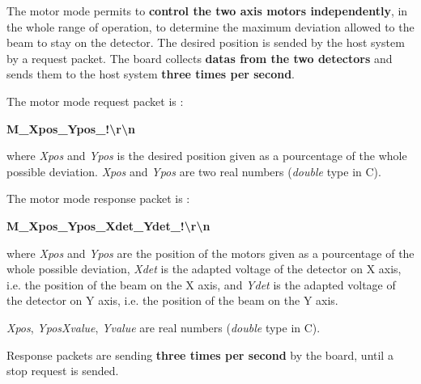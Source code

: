\documentclass[14pt,fleqn]{book} %
\begin{document}
The motor mode permits to \textbf{control the two axis motors independently}, in the whole range of operation, to determine the maximum deviation allowed to the beam to stay on the detector. The desired position is sended by the host system by a request packet. The board collects \textbf{datas from the two detectors} and sends them to the host system \textbf{three times per second}.

\medskip

The motor mode request packet is : 

\begin{center}
\textbf{\color{blue}\large M\_Xpos\_Ypos\_!\textbackslash{}r\textbackslash{}n}
\end{center}

\medskip

where \textit{\color{blue}Xpos} and \textit{\color{blue}Ypos} is the desired position given as a pourcentage of the whole possible deviation. \textit{\color{blue}Xpos} and \textit{\color{blue}Ypos} are two real numbers (\textit{double} type in C).

\medskip


The motor mode response packet is : 

\begin{center}
\textbf{\color{orange}\large M\_Xpos\_Ypos\_Xdet\_Ydet\_!\textbackslash{}r\textbackslash{}n}
\end{center}


\medskip

where \textit{\color{orange}Xpos} and \textit{\color{orange}Ypos} are the position of the motors given as a pourcentage of the whole possible deviation, \textit{\color{orange}Xdet} is the adapted voltage of the detector on X axis, i.e. the position of the beam on the X axis, and \textit{\color{orange}Ydet} is the adapted voltage of the detector on Y axis, i.e. the position of the beam on the Y axis. 

\textit{\color{orange}Xpos}, \textit{\color{orange}Ypos}\textit{\color{orange}Xvalue}, \textit{\color{orange}Yvalue} are real numbers (\textit{double} type in C).

Response packets are sending \textbf{three times per second} by the board, until a stop request is sended.
\end{document}
